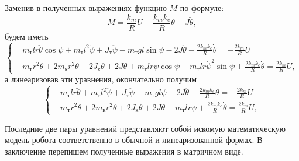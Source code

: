 \documentclass[12pt,a4paper,openany]{extarticle}
\begin{document}
Заменив в полученных выражениях функцию $M$ по формуле:
\begin{equation}
	M = \frac{k_m}{R}U - \frac{k_mk_e}{R}\dot\theta - J\ddot\theta,
\end{equation}
будем иметь
\begin{equation}\label{from_lagr's_eqs_without_M}
	\left\{
	\begin{aligned}
		\!&m_\text{т}lr\ddot\theta\cos\psi + m_\text{т}l^2\ddot\psi + J_\text{т}\ddot\psi - m_\text{т}gl\sin\psi - 2J\ddot\theta -
			\frac{2k_mk_e}{R}\dot\theta  = -\frac{2k_m}{R}U\\
		\!&m_\text{т}r^2\ddot\theta + 2m_\text{к}r^2\ddot\theta + 2J_\text{к}\ddot\theta + 2J\ddot\theta + m_\text{т}lr\ddot\psi\cos\psi -
			m_\text{т}lr\dot\psi^2\sin\psi  + \frac{2k_mk_e}{R}\dot\theta= \frac{2k_m}{R}U,
	\end{aligned}
	\right.
\end{equation}
а линеаризовав эти уравнения, окончательно получим
\begin{equation}\label{final_eqs}
	\left\{
	\begin{aligned}
		\!&m_\text{т}lr\ddot\theta + m_\text{т}l^2\ddot\psi + J_\text{т}\ddot\psi - m_\text{т}gl\psi - 2J\ddot\theta - 
			\frac{2k_mk_e}{R}\dot\theta  = -\frac{2k_m}{R}U\\
		\!&m_\text{т}r^2\ddot\theta + 2m_\text{к}r^2\ddot\theta + 2J_\text{к}\ddot\theta + 2J\ddot\theta + m_\text{т}lr\ddot\psi +
		\frac{2k_mk_e}{R}\dot\theta= \frac{2k_m}{R}U,
	\end{aligned}
	\right.
\end{equation}

Последние две пары уравнений представляют собой искомую математическую модель робота соответственно в обычной и линеаризованной формах.
В заключение перепишем полученные выражения в матричном виде.
\end{document}
